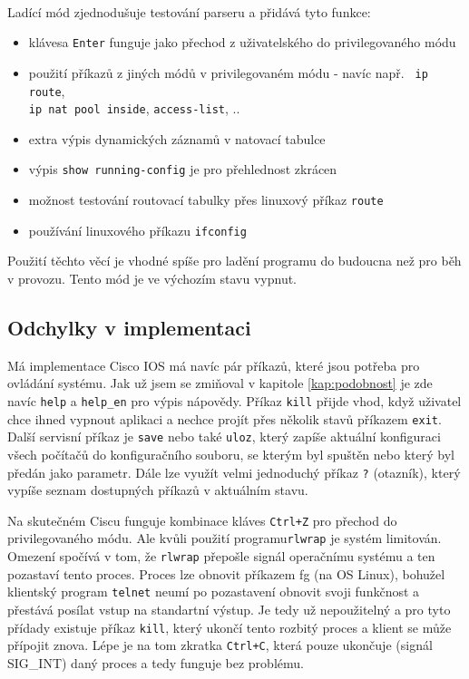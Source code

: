 \paragraph{}
Ladící mód zjednodušuje testování parseru a přidává tyto funkce:
\begin{itemize}
 \item klávesa \verb|Enter| funguje jako přechod z uživatelského do privilegovaného módu
 \item použití příkazů z jiných módů v privilegovaném módu - navíc např. \verb| ip route|, \\\verb|ip nat pool inside|, \verb|access-list|, ..
 \item extra výpis dynamických záznamů v natovací tabulce
 \item výpis \verb|show running-config| je pro přehlednost zkrácen
 \item možnost testování routovací tabulky přes linuxový příkaz \verb|route|
 \item používání linuxového příkazu \verb|ifconfig|
\end{itemize}
Použití těchto věcí je vhodné spíše pro ladění programu do budoucna než pro běh v  provozu. Tento mód je ve výchozím stavu vypnut.


\subsection{Odchylky v implementaci}
Má implementace Cisco IOS má navíc pár příkazů, které jsou potřeba pro ovládání systému. Jak už jsem se zmiňoval v kapitole \ref{kap:podobnost} je zde navíc \verb|help| a \verb|help_en| pro výpis nápovědy. Příkaz \verb|kill| přijde vhod, když uživatel chce ihned vypnout aplikaci a nechce projít přes několik stavů příkazem \verb|exit|. Další servisní příkaz je \verb|save| nebo také \verb|uloz|, který zapíše aktuální konfiguraci všech počítačů do konfiguračního souboru, se kterým byl spuštěn nebo který byl předán jako parametr. Dále lze využít velmi jednoduchý příkaz \verb|?| (otazník), který vypíše seznam dostupných příkazů v aktuálním stavu.

Na skutečném Ciscu funguje kombinace kláves \verb|Ctrl+Z| pro přechod do privilegovaného módu. Ale kvůli použití programu\verb|rlwrap| je systém limitován. Omezení spočívá v tom, že \verb|rlwrap| přepošle signál operačnímu systému a ten pozastaví tento proces. Proces lze obnovit příkazem fg (na OS Linux), bohužel klientský program \verb|telnet| neumí po pozastavení obnovit svoji funkčnost a přestává posílat vstup na standartní výstup. Je tedy už nepoužitelný a pro tyto přídady existuje příkaz \verb|kill|, který ukončí tento rozbitý proces a klient se může přípojit znova. Lépe je na tom zkratka \verb|Ctrl+C|, která pouze ukončuje (signál SIG\_INT) daný proces a tedy funguje bez problému. 

